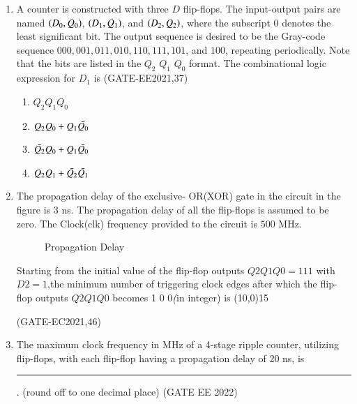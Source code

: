 \begin{enumerate}

\item A counter is constructed with three $D$ flip-flops. The input-output pairs are named $\left(D_0, Q_0\right)$, $\left(D_1, Q_1\right)$, and $\left(D_2, Q_2\right)$, where the subscript $0$ denotes the least significant bit. The output sequence is desired to be the Gray-code sequence $000, 001, 011, 010, 110, 111, 101$, and $100$, repeating periodically. Note that the bits are listed in the $Q_2$  $Q_1$  $Q_0$ format. The combinational logic expression for $D_1$ is
\hfill(GATE-EE2021,37)

\begin{enumerate}
    \item $Q_2 Q_1 Q_0$
    \item $Q_2 Q_0 + Q_1 \Bar{Q_0}$
    \item $\Bar{Q_2} Q_0 + Q_1 \Bar{Q_0}$
    \item $Q_2 Q_1 + \Bar{Q_2} \Bar{Q_1}$
\end{enumerate}


\item The propagation delay of the exclusive- OR(XOR) gate in the circuit in the figure is $3$ ns. The propagation delay of all the flip-flops is assumed to be zero. The Clock(clk) frequency provided to the circuit is $500$ MHz.

	\begin{figure}[H]
    \centering
    
    \caption{Propagation Delay}
	\label{fig:PropagationDelay}
\end{figure}
Starting from the initial value of the flip-flop outputs $Q2Q1Q0 =1 1 1$ with $D2=1$,the minimum number of triggering clock edges after which the flip-flop outputs $Q2Q1Q0$ becomes 1 0 0\emph (in integer) is \line(10,0){15}

\hfill(GATE-EC2021,46)


\item The maximum clock frequency in MHz of a 4-stage ripple counter, utilizing flip-flops, with each flip-flop having a propagation delay of 20 ns, is \rule{1cm}{0.10mm}. (round off to one decimal place)
\label{gate-ee-2022-29}
\hfill (GATE EE 2022)


\end{enumerate}
